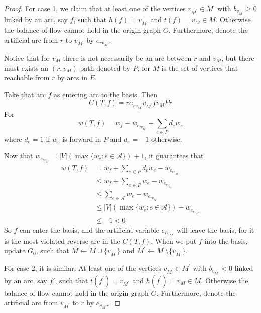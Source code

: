\begin{proof}
						For case 1, we claim that at least one of the vertices $v_{M^\prime} \in M^\prime$ with $b_{v_{M^\prime}} \ge 0$ linked by an arc, say $f$, such that $h(f) = v_{M^\prime}$ and $t(f) = v_M \in M$. Otherwise the balance of flow cannot hold in the origin graph $G$. Furthermore, denote the artificial arc from $r$ to $v_{M^\prime}$ by $e_{rv_{M^\prime}}$.

						Notice that for $v_M$ there is not necessarily be an arc between $r$ and $v_M$, but there must exists an $(r, v_M)$-path denoted by $P$, for $M$ is the set of vertices that reachable from $r$ by arcs in $E$.

						Take that arc $f$ as entering arc to the basis. Then 
						\begin{equation}
							C(T, f) = re_{rv_{M^\prime}}v_{M^\prime}fv_MPr
						\end{equation}
						For
						\begin{equation}
							w(T, f) = w_f - w_{e_{rv_{M^\prime}}} + \sum_{e \in P} d_e w_e
						\end{equation}
						where $d_e = 1$ if $w_e$ is forward in $P$ and $d_e = -1$ otherwise.

						Now that $w_{e_{rv_{M^\prime}}} = |V|(\max\{w_e: e\in \mathcal{A}\}) + 1$, it guarantees that
						\begin{align}
							w(T, f) &= w_f + \sum_{e \in P} d_e w_e - w_{e_{rv_{M^\prime}}}\\
							        &\le w_f + \sum_{e \in P}w_e - w_{e_{rv_{M^\prime}}}\\
							        &\le \sum_{e \in \mathcal{A}}w_e - w_{e_{rv_{M^\prime}}}\\
							        &\le |V|(\max\{w_e: e\in \mathcal{A}\}) - w_{e_{rv_{M^\prime}}}\\
							        &\le -1 < 0 
						\end{align}
						So $f$ can enter the basis, and the artificial variable $e_{rv_{M^\prime}}$ will leave the basis, for it is the most violated reverse arc in the $C(T, f)$. When we put $f$ into the basis, update $G_0$, such that $M \leftarrow M \cup \{v_{M^\prime}\}$ and $M^\prime \leftarrow M^\prime \setminus \{v_{M^\prime}\}$.

						For case 2, it is similar. At least one of the vertices $v_{M^\prime} \in M^\prime$ with $b_{v_{M^\prime}} < 0$ linked by an arc, say $f\prime$, such that $t(f^\prime) = v_{M^\prime}$ and $h(f^\prime) = v_M \in M$. Otherwise the balance of flow cannot hold in the origin graph $G$. Furthermore, denote the artificial arc from $v_{M^\prime}$ to $r$ by $e_{v_{M^\prime}r}$.


\end{proof}
